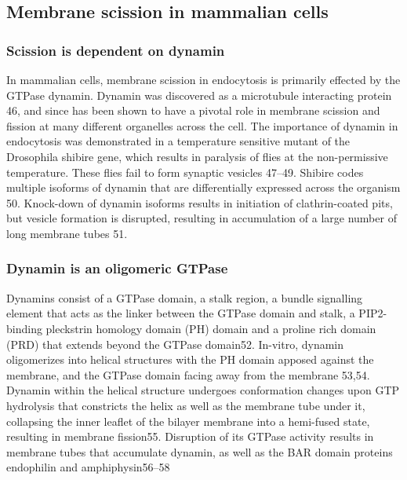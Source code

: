 		
\subsection{Membrane scission in mammalian cells}
		\subsubsection{Scission is dependent on dynamin} 
		In mammalian cells, membrane scission in endocytosis is primarily effected by the GTPase dynamin. Dynamin was discovered as a microtubule interacting protein 46, and since has been shown to have a pivotal role in membrane scission and fission at many different organelles across the cell. The importance of dynamin in endocytosis was demonstrated in a temperature sensitive mutant of the Drosophila shibire gene, which results in paralysis of flies at the non-permissive temperature. These flies fail to form synaptic vesicles 47–49. Shibire codes multiple isoforms of dynamin that are differentially expressed across the organism 50. Knock-down of dynamin isoforms results in initiation of clathrin-coated pits, but vesicle formation is disrupted, resulting in accumulation of a large number of long membrane tubes 51. 

		 
		\subsubsection{Dynamin is an oligomeric GTPase}
		Dynamins consist of a GTPase domain, a stalk region, a bundle signalling element that acts as the linker between the GTPase domain and stalk, a PIP2-binding pleckstrin homology domain (PH) domain and a proline rich domain (PRD) that extends beyond the GTPase domain52. In-vitro, dynamin oligomerizes into helical structures with the PH domain apposed against the membrane, and the GTPase domain facing away from the membrane 53,54. Dynamin within the helical structure undergoes conformation changes upon GTP hydrolysis that constricts the helix as well as the membrane tube under it, collapsing the inner leaflet of the bilayer membrane into a hemi-fused state, resulting in membrane fission55. Disruption of its GTPase activity results in membrane tubes that accumulate dynamin, as well as the BAR domain proteins endophilin and amphiphysin56–58

